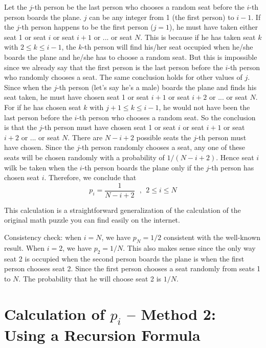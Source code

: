 \documentclass[11pt]{article}
\newcommand{\beq}{\begin{equation}}
\newcommand{\eeq}{\end{equation}}
\newcommand{\ve}[1]{\mbox{\boldmath $#1$}}
\numberwithin{equation}{section}
\begin{document}
Let the $j$-th person be the last person 
who chooses a random seat before the $i$-th person 
boards the plane. $j$ can be any integer from 1 (the first person) to $i-1$. 
If the $j$-th person happens to be the first person ($j=1$), he must have 
taken either seat 1 or seat $i$ or seat $i+1$ or ... or seat $N$. This is because 
if he has taken seat $k$ with $2 \leq k \leq i-1$, the $k$-th person 
will find his/her seat occupied when he/she boards the plane and he/she has to 
choose a random seat. But this is impossible since 
we already say that the first person is the last person before the $i$-th person 
who randomly chooses a seat. The same conclusion holds for other values of $j$. 
Since when the $j$-th person (let's say he's a male) boards the plane and finds 
his seat taken, he must have 
chosen seat 1 or seat $i+1$ or seat $i+2$ or ... or seat $N$. For if he has chosen 
seat $k$ with $j+1 \leq k \leq i-1$, he would not have been the last person before 
the $i$-th person who chooses a random seat. So the conclusion is that the $j$-th 
person must have chosen seat 1 or seat $i$ or seat $i+1$ or seat $i+2$ or ... or seat $N$. 
There are $N-i+2$ possible seats the $j$-th person must have chosen. Since 
the $j$-th person randomly chooses a seat, any one of these seats will be chosen randomly 
with a probability of $1/(N-i+2)$. Hence seat $i$ wilk be taken when the $i$-th person 
boards the plane only if the $j$-th person has chosen seat $i$. Therefore, we conclude that 
\beq
  \boxed{ p_i = \frac{1}{N-i+2} \ \ \ , \ \ 2 \leq i \leq N }
\eeq

This calculation is a straightforward generalization of the calculation of 
the original math puzzle you can find easily on the internet. 

Consistency check: when $i=N$, we have $p_N = 1/2$ consistent with the 
well-known result. When $i=2$, we have $p_2 = 1/N$. This also makes sense 
since the only way seat 2 is occupied when the second person boards the 
plane is when the first person chooses seat 2. Since the first person chooses 
a seat randomly from seats 1 to $N$. The probability that he will choose 
seat 2 is $1/N$.

\section{Calculation of \ve{p_i} -- Method 2: Using a Recursion Formula}
\end{document}
